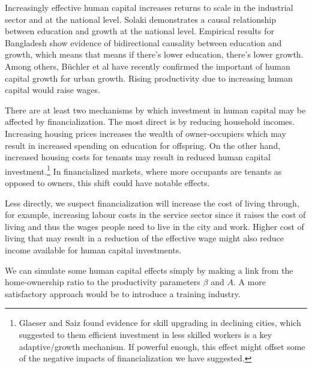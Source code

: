 Increasingly effective human capital increases returns to scale in the industrial sector and at the national level. 
Solaki \cite{solakiRelationshipEducationGDP2013} demonstrates a causal relationship between education and growth at the national level. Empirical results for Bangladesh \cite{islam2007relationship} show evidence of bidirectional causality between education and growth, which means that means if there's lower education, there's lower growth.  Among others, B\"uchler et al \cite{buchlerImpactHumanCapital2024} have recently confirmed the important of human capital growth for urban growth.
Rising productivity due to increasing human capital would raise wages. %
 
There are at least two mechanisms by which investment in human capital may be affected by financialization. The most direct is by reducing household incomes. Increasing housing prices increases the wealth of owner-occupiers which may result in increased spending on education for offspring. On the other hand, increased housing costs for tenants may result in reduced human capital investment.\footnote{Glaeser and Saiz found evidence for skill upgrading in declining cities, which suggested to them efficient investment in less skilled workers is a key adaptive/growth mechanism. If powerful enough, this effect might offset some of the negative impacts of financialization we have suggested.} %
In financialized markets, where more occupants are tenants as opposed to owners, this shift could have notable effects. 

Less directly, we suspect financialization will increase the cost of living through, for example, increasing labour costs in the service sector since it raises the cost of living and thus the wages people need to live in the city and work. Higher cost of living that may result in a reduction of the effective wage might also reduce income available for human capital investments. %

We can simulate some human capital effects simply by making a link from the home-ownership ratio to the productivity parameters  $\beta$ and $A$. A more satisfactory approach would be to introduce a training industry. %



